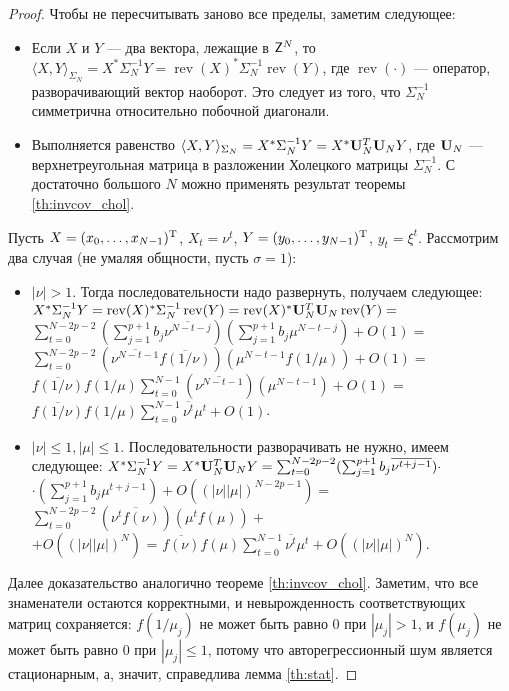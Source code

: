 \documentclass[12pt,a4paper]{article}
\def\rev{\mathop{\mathrm{rev}}}
\begin{document}
\begin{proof}
	Чтобы не пересчитывать заново все пределы, заметим следующее:
	\begin{itemize}
		\item Если $X$ и $Y$ --- два вектора, лежащие в $\mathsf{Z}^N$, то $\langle X, Y \rangle_{\Sigma_N} = X^* \Sigma_N^{-1} Y = \rev(X)^* \Sigma_N^{-1} \rev(Y)$, где $\rev(\cdot)$ --- оператор, разворачивающий вектор наоборот. Это следует из того, что $\Sigma_N^{-1}$ симметрична относительно побочной диагонали.
		\item Выполняется равенство $\langle X, Y \rangle_{\Sigma_N} = X^* \Sigma_N^{-1} Y = X^* \mathbf{U}_N^T \mathbf{U}_N Y$, где $\mathbf{U}_N$ --- верхнетреугольная матрица в разложении Холецкого матрицы $\Sigma_N^{-1}$. С достаточно большого $N$ можно применять результат теоремы \ref{th:invcov_chol}.
	\end{itemize}
	
	Пусть $X = (x_0, \ldots, x_{N - 1})^{\mathrm{T}}$, $X_t = \nu^t$, $Y = (y_0, \ldots, y_{N - 1})^{\mathrm{T}}$, $y_t = \xi^t$. Рассмотрим два случая (не умаляя общности, пусть $\sigma = 1$):
	\begin{itemize}
		\item $|\nu| > 1$. Тогда последовательности надо развернуть, получаем следующее:
		$X^* \Sigma_N^{-1} Y = \rev(X)^* \Sigma_N^{-1} \rev(Y) =  \rev(X)^* \bfU_N^T \bfU_N  \rev(Y) =$ \\$\sum_{t=0}^{N-{2p} -2} (\sum_{j=1}^{p+1}b_j \overline{\nu^{N - t - j}}) (\sum_{j=1}^{p+1}b_j \mu^{N - t - j}) + O(1) = $\\ $\sum_{t=0}^{N-{2p} - 2} (\overline{\nu^{N - t - 1}} \overline{f(1/\nu)})  (\mu^{N - t - 1}f(1/\mu)) + O(1) =$\\ $\overline{f(1/\nu)} f(1/\mu)\sum_{t=0}^{N-1} (\overline{\nu^{N - t - 1}} ) (\mu^{N - t - 1}) + O(1) = $\\
		$\overline{f(1/\nu)} f(1/\mu)\sum_{t=0}^{N-1} \overline{\nu^t} \mu^t + O(1)$.
		\item $|\nu| \le 1, |\mu| \le 1$. Последовательности разворачивать не нужно, имеем следующее:
		$X^* \Sigma_N^{-1} Y = X^* \mathbf{U}_N^T \mathbf{U}_N Y = \sum_{t=0}^{N-{2p}-2} (\sum_{j=1}^{p+1}b_j \overline{\nu^{
				t + j - 1}}) \cdot$ \\$\cdot (\sum_{j=1}^{p+1}b_j \mu^{t + j - 1}) + O((|\nu||\mu|)^{N - 2p - 1}) =$  
		$\sum_{t=0}^{N-{2p} -2} (\overline{\nu^t f(\nu)})(\mu^t f(\mu)) +$\\ $+ O((|\nu||\mu|)^{N})$ = 
		$\overline{f(\nu)} f(\mu) \sum_{t=0}^{N-1} \overline{\nu^t} \mu^t + O((|\nu||\mu|)^{N})$.
	\end{itemize}
	
	Далее доказательство аналогично теореме \ref{th:invcov_chol}. Заметим, что все знаменатели остаются корректными, и невырожденность соответствующих матриц сохраняется: $f(1/\mu_j)$ не может быть равно $0$ при $|\mu_j| > 1$, и $f(\mu_j)$ не может быть равно $0$ при $|\mu_j| \le 1$, потому что авторегрессионный шум является стационарным, а, значит, справедлива лемма \ref{th:stat}.
\end{proof}
\end{document}
